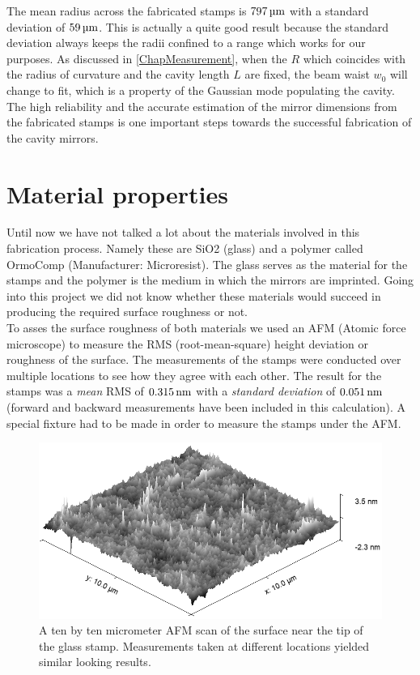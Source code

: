 The mean radius across the fabricated stamps is $797\um$ with a standard deviation of $59\um$. This is actually a quite good result because the standard deviation always keeps the radii confined to a range which works for our purposes. As discussed in \autoref{ChapMeasurement}, when the $R$ which coincides with the radius of curvature and the cavity length $L$ are fixed, the beam waist $w_0$ will change to fit, which is a property of the Gaussian mode populating the cavity. The high reliability and the accurate estimation of the mirror dimensions from the fabricated stamps is one important steps towards the successful fabrication of the cavity mirrors.

\section{Material properties}\label{ChapMatProp}
Until now we have not talked a lot about the materials involved in this fabrication process. Namely these are SiO2 (glass) and a polymer called OrmoComp (Manufacturer: Microresist). The glass serves as the material for the stamps and the polymer is the medium in which the mirrors are imprinted. Going into this project we did not know whether these materials would succeed in producing the required surface roughness or not.\\
To asses the surface roughness of both materials we used an AFM (Atomic force microscope) to measure the RMS (root-mean-square) height deviation or roughness of the surface. The measurements of the stamps were conducted over multiple locations to see how they agree with each other. The result for the stamps was a \textit{mean} RMS of $0.315\nm$ with a \textit{standard deviation} of $0.051\nm$ (forward and backward measurements have been included in this calculation). A special fixture had to be made in order to measure the stamps under the AFM.\\
\begin{figure}[H]
	\includegraphics[scale=0.5]{source/stamp_rms}
	\caption{A ten by ten micrometer AFM scan of the surface near the tip of the glass stamp. Measurements taken at different locations yielded similar looking results.}
\end{figure}
